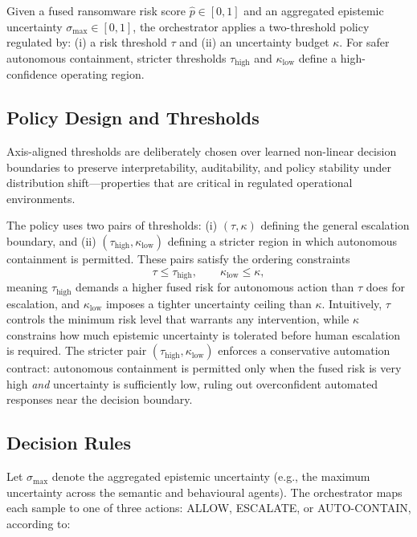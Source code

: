 \documentclass[lettersize,journal]{IEEEtran}
\begin{document}
Given a fused ransomware risk score $\hat{p} \in [0,1]$ and an aggregated epistemic
uncertainty $\sigma_{\max} \in [0,1]$, the orchestrator applies a two-threshold
policy regulated by: (i) a risk threshold $\tau$ and (ii) an uncertainty budget
$\kappa$. For safer autonomous containment, stricter thresholds
$\tau_{\text{high}}$ and $\kappa_{\text{low}}$ define a high-confidence operating
region.


\subsection{Policy Design and Thresholds}
\label{subsec:policy_thresholds}
Axis-aligned thresholds are deliberately chosen over learned non-linear decision boundaries to preserve interpretability, auditability, and policy stability under distribution shift—properties that are critical in regulated operational environments.

The policy uses two pairs of thresholds:
(i) $(\tau,\kappa)$ defining the general escalation boundary, and
(ii) $(\tau_{\text{high}},\kappa_{\text{low}})$ defining a stricter region in which
autonomous containment is permitted.
These pairs satisfy the ordering constraints
\begin{equation}
\tau \le \tau_{\text{high}}, \qquad \kappa_{\text{low}} \le \kappa,
\label{eq:threshold_order}
\end{equation}
meaning $\tau_{\text{high}}$ demands a higher fused risk for autonomous action than $\tau$
does for escalation, and $\kappa_{\text{low}}$ imposes a tighter uncertainty ceiling than
$\kappa$. Intuitively, $\tau$ controls the minimum risk level that warrants any intervention,
while $\kappa$ constrains how much epistemic uncertainty is tolerated before human escalation
is required. The stricter pair $(\tau_{\text{high}},\kappa_{\text{low}})$ enforces a
conservative automation contract: autonomous containment is permitted only when the fused
risk is very high \emph{and} uncertainty is sufficiently low, ruling out overconfident
automated responses near the decision boundary.

\subsection{Decision Rules}
\label{subsec:policy_rules}

Let $\sigma_{\max}$ denote the aggregated epistemic uncertainty (e.g., the maximum
uncertainty across the semantic and behavioural agents). The orchestrator maps each
sample to one of three actions: \textsc{ALLOW}, \textsc{ESCALATE}, or
\textsc{AUTO-CONTAIN}, according to:
\end{document}
